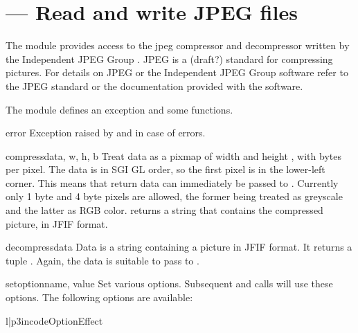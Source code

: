 \section{ ---
         Read and write JPEG files}



The module  provides access to the jpeg compressor and
decompressor written by the Independent JPEG Group%
%
. JPEG is a (draft?)
standard for compressing pictures.  For details on JPEG or the
Independent JPEG Group software refer to the JPEG standard or the
documentation provided with the software.

The  module defines an exception and some functions.

\begin{excdesc}{error}
Exception raised by  and 
in case of errors.
\end{excdesc}

\begin{funcdesc}{compress}{data, w, h, b}
Treat data as a pixmap of width  and height , with
 bytes per pixel.  The data is in SGI GL order, so the first
pixel is in the lower-left corner. This means that 
return data can immediately be passed to .
Currently only 1 byte and 4 byte pixels are allowed, the former being
treated as greyscale and the latter as RGB color.
 returns a string that contains the compressed
picture, in JFIF format.
\end{funcdesc}

\begin{funcdesc}{decompress}{data}
Data is a string containing a picture in JFIF format. It
returns a tuple .  Again, the data is suitable to pass to
.
\end{funcdesc}

\begin{funcdesc}{setoption}{name, value}
Set various options.  Subsequent  and
 calls will use these options.  The following
options are available:

\begin{tableii}{l|p{3in}}{code}{Option}{Effect}
\end{tableii}
\end{funcdesc}
